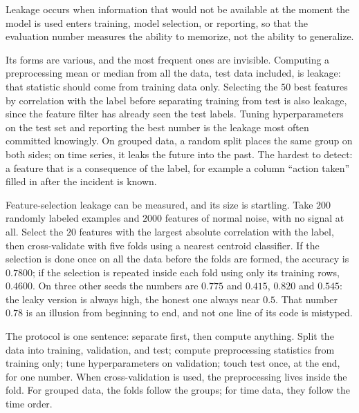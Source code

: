 
\begin{definisi}
Leakage occurs when information that would not be available at the moment the model is used enters
training, model selection, or reporting, so that the evaluation number measures the ability to
memorize, not the ability to generalize.
\end{definisi}

Its forms are various, and the most frequent ones are invisible. Computing a preprocessing mean or
median from all the data, test data included, is leakage: that statistic should come from training
data only. Selecting the $50$ best features by correlation with the label before separating
training from test is also leakage, since the feature filter has already seen the test labels.
Tuning hyperparameters on the test set and reporting the best number is the leakage most often
committed knowingly. On grouped data, a random split places the same group on both sides; on time
series, it leaks the future into the past. The hardest to detect: a feature that is a consequence
of the label, for example a column ``action taken'' filled in after the incident is known.

Feature-selection leakage can be measured, and its size is startling. Take $200$ randomly labeled
examples and $2000$ features of normal noise, with no signal at all. Select the $20$ features with
the largest absolute correlation with the label, then cross-validate with five folds using a nearest
centroid classifier. If the selection is done once on all the data before the folds are formed, the
accuracy is $0.7800$; if the selection is repeated inside each fold using only its training rows,
$0.4600$. On three other seeds the numbers are $0.775$ and $0.415$, $0.820$ and $0.545$: the leaky
version is always high, the honest one always near $0.5$. That number $0.78$ is an illusion from
beginning to end, and not one line of its code is mistyped.

The protocol is one sentence: separate first, then compute anything. Split the data into training,
validation, and test; compute preprocessing statistics from training only; tune hyperparameters on
validation; touch test once, at the end, for one number. When cross-validation is used, the
preprocessing lives inside the fold. For grouped data, the folds follow the groups; for time data,
they follow the time order.

